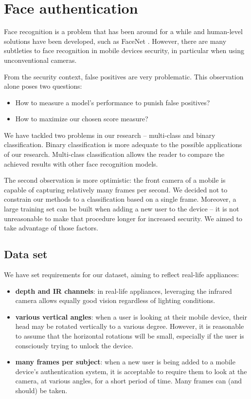 \chapter{Face authentication}
    Face recognition is a problem that has been around for a while and
    human-level solutions have been developed, such as FaceNet \cite{arXiv:1503.03832}.
    However, there are many subtleties to face recognition in mobile devices
    security, in particular when using unconventional cameras.

    From the security context, false positives are very problematic. This observation alone
    poses two questions:
    \begin{itemize}
      \item How to measure a model's performance to punish false positives?
      \item How to maximize our chosen score measure?
    \end{itemize}
    We have tackled two problems in our research -- multi-class and binary classification.
    Binary classification is more adequate to the possible applications of our research.
    Multi-class classification allows the reader to compare the achieved results
    with other face recognition models.

    The second observation is more optimistic: the front camera of a mobile is capable of
    capturing relatively many frames per second. We decided not to constrain our
    methods to a classification based on a single frame.
    Moreover, a large training set can be built
    when adding a new user to the device -- it is not unreasonable to make that procedure
    longer for increased security. We aimed to take advantage of those factors.

    \section{Data set}
    We have set requirements for our dataset, aiming to reflect real-life
    appliances:
    \begin{itemize}
        \item \textbf{depth and IR channels}: in real-life appliances, leveraging
        the infrared camera allows equally good vision regardless of lighting
        conditions.
        \item \textbf{various vertical angles}: when a user is looking at their
        mobile device,
        their head may be rotated vertically to a various degree.
        However, it is reasonable to assume that the horizontal rotations will be small,
        especially if the user is consciously trying to
        unlock the device.
        \item \textbf{many frames per subject}: when a new user is being added
        to a mobile device's authentication system, it is acceptable to require
        them to look at the camera, at various angles, for a short period of
        time. Many frames can (and should) be taken.
    \end{itemize}

